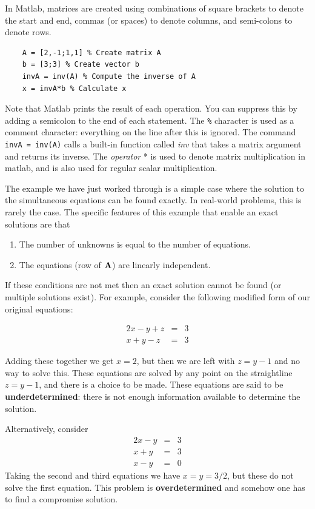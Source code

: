 \documentclass[12pt,a4paper]{tufte-handout}
\begin{document}
  In Matlab, matrices are created using combinations of square brackets to denote the start and end, commas (or spaces) to denote columns, and semi-colons to denote rows.
  \begin{lstlisting}
    A = [2,-1;1,1] % Create matrix A
    b = [3;3] % Create vector b
    invA = inv(A) % Compute the inverse of A
    x = invA*b % Calculate x
  \end{lstlisting}

  Note that Matlab prints the result of each operation. You can suppress this by adding a semicolon to the end of each statement. The \texttt{\%} character is used as a comment character: everything on the line after this is ignored. The command \texttt{invA = inv(A)} calls a built-in function called \textit{inv} that takes a matrix argument and returns its inverse. The \textit{operator} * is used to denote matrix multiplication in matlab, and is also used for regular scalar multiplication.

The example we have just worked through is a simple case where the solution to the simultaneous equations can be found exactly. In real-world problems, this is rarely the case. The specific features of this example that enable an exact solutions are that
\begin{enumerate}
  \item The number of unknowns is equal to the number of equations.
  \item The equations (row of $\mathbf{A}$) are linearly independent.
\end{enumerate}

If these conditions are not met then an exact solution cannot be found (or multiple solutions exist). For example, consider the following modified form of our original equations:

\begin{eqnarray}
  2x-y+z &=& 3\\
  x+y-z &=&3
\end{eqnarray}

Adding these together we get $x=2$, but then we are left with $z=y-1$ and no way to solve this. These equations are solved by any point on the straightline $z=y-1$, and there is a choice to be made. These equations are said to be \textbf{underdetermined}: there is not enough information available to determine the solution.

Alternatively, consider
\begin{eqnarray}
  2x-y &=& 3\\
  x+y &=&3\\
  x-y &=&0 
\end{eqnarray}
Taking the second and third equations we have $x=y=3/2$, but these do not solve the first equation. This problem is \textbf{overdetermined} and somehow one has to find a compromise solution.
\end{document}
